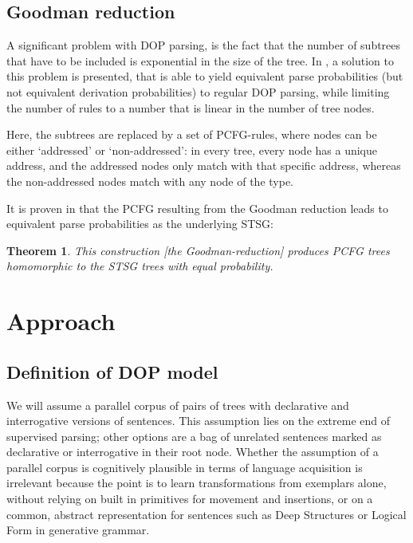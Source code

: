 \documentclass[a4paper]{article}
\newtheorem{theorem}{Theorem}[section]
\theoremstyle{definition}
\begin{document}
\subsection{Goodman reduction}

A significant problem with DOP parsing, is the fact that the number of subtrees
that have to be included is exponential in the size of the tree. In \cite{Go},
a solution to this problem is presented, that is able to yield equivalent parse
probabilities (but not equivalent derivation probabilities) to regular DOP
parsing, while limiting the number of rules to a number that is linear in the
number of tree nodes.

Here, the subtrees are replaced by a set of PCFG-rules, where nodes can be
either `addressed' or `non-addressed': in every tree, every node has a unique
address, and the addressed nodes only match with that specific address, whereas
the non-addressed nodes match with any node of the type.

It is proven in \cite{Go} that the PCFG resulting from the Goodman reduction
leads to equivalent parse probabilities as the underlying STSG:

\begin{theorem}
This construction [the Goodman-reduction] produces PCFG trees homomorphic to
the STSG trees with equal probability.
\end{theorem}

\section{Approach}
\label{sec:approach}

\subsection{Definition of DOP model}

We will assume a parallel corpus of pairs of trees with declarative and
interrogative versions of sentences. This assumption lies on the extreme
end of supervised parsing; other options are a bag of unrelated sentences
marked as declarative or interrogative in their root node. Whether the
assumption of a parallel corpus is cognitively plausible in terms of
language acquisition is irrelevant because the point is to learn
transformations from exemplars alone, without relying on built in primitives
for movement and insertions, or on a common, abstract representation for
sentences such as Deep Structures or Logical Form in generative grammar.
\end{document}
